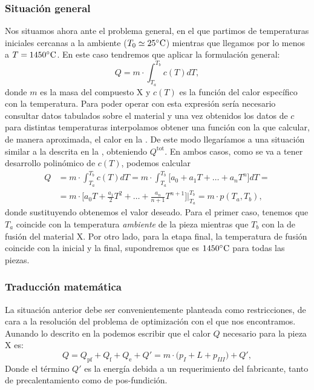 \subsubsection{Situación general} \label{SituacionGeneral}
%
%
%
Nos situamos ahora ante el problema general, en el que partimos de temperaturas iniciales cercanas a la ambiente ($T_0 \simeq 25 ^{\circ} \text{C}$) mientras que llegamos por lo menos a $T = 1450 ^{\circ} \text{C}$. En este caso tendremos que aplicar la formulación general:
\begin{equation}
    Q = m \cdot \int_{T_a}^{T_b} c(T)dT,
    \label{calor}
\end{equation}
donde $m$ es la masa del compuesto X y $c(T)$ es la función del calor específico con la temperatura. Para poder operar con esta expresión sería necesario consultar datos tabulados sobre el material y una vez obtenidos los datos de $c$ para distintas temperaturas interpolamos obtener una función con la que calcular, de manera aproximada, el calor en la .
De este modo llegaríamos a una situación similar a la descrita en la , obteniendo $Q^{\text{tot}}$. En ambos casos, como se va a tener desarrollo polinómico de $c(T)$, podemos calcular
\begin{align}
    Q & = m \cdot \int_{T_a}^{T_b} c(T)dT = m \cdot \int_{T_a}^{T_b} \Big[a_0+ a_1 T + \dots + a_nT^n \Big]dT = \\
    & = m \cdot \Big[a_0T+ \frac{a_1}{2} T^2 + \dots + \frac{a_n}{n+1} T^{n+1}\Big] \bigg|_{T_a}^{T_b} = m \cdot p(T_a, T_b),
\end{align}
donde sustituyendo obtenemos el valor deseado. Para el primer caso, tenemos que $T_a$ coincide con la temperatura \textit{ambiente} de la pieza mientras que $T_b$ con la de fusión del material X. Por otro lado, para la etapa final, la temperatura de fusión coincide con la inicial y la final, supondremos que es $1450 ^{\circ} \text{C}$ para todas las piezas.
\subsubsection{Traducción matemática}
La situación anterior debe ser convenientemente planteada como restricciones, de cara a la resolución del problema de optimización con el que nos encontramos. Aunando lo descrito en la  podemos escribir que el calor $Q$ necesario para la pieza X es:
\begin{equation}
    Q = Q_{\text{pf}} + Q_{\text{f}} + Q_{\text{e}} + Q' = m \cdot \Big( p_I + L + p_{III} \Big) + Q',
\end{equation}
Donde el término $Q'$ es la energía debida a un requerimiento del fabricante, tanto de precalentamiento como de pos-fundición.\\

